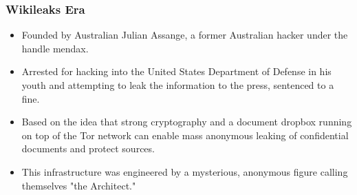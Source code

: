 \documentclass[aspectratio=169,usenames,dvipsnames]{beamer}
\begin{document}
\begin{frame}
  \frametitle{Wikileaks Era}

  \begin{itemize}[<+->]
    \item Founded by Australian Julian Assange, a former Australian hacker
      under the handle mendax.
    \item Arrested for hacking into the United States Department of Defense in
      his youth and attempting to leak the information to the press, sentenced
      to a fine.
    \item Based on the idea that strong cryptography and a document dropbox
      running on top of the Tor network can enable mass anonymous leaking of
      confidential documents and protect sources.
    \item This infrastructure was engineered by a mysterious, anonymous figure
      calling themselves "the Architect."
  \end{itemize}

\end{frame}
\end{document}
